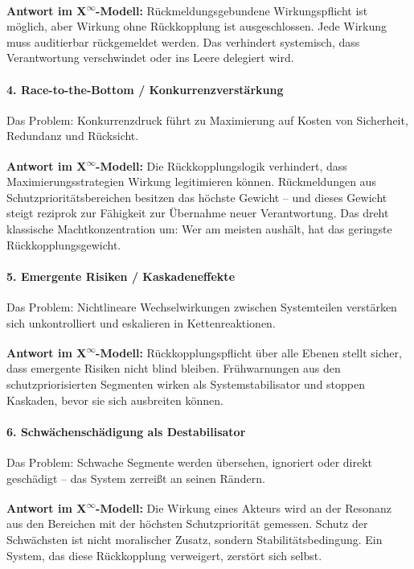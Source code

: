 \documentclass[12pt,a4paper]{article}
\begin{document}
\textbf{Antwort im X\textsuperscript{\(\infty\)}-Modell:}  
Rückmeldungsgebundene Wirkungspflicht ist möglich, aber Wirkung ohne Rückkopplung ist ausgeschlossen.  
Jede Wirkung muss auditierbar rückgemeldet werden.  
Das verhindert systemisch, dass Verantwortung verschwindet oder ins Leere delegiert wird.

\paragraph{4. Race-to-the-Bottom / Konkurrenzverstärkung}

Das Problem:  
Konkurrenzdruck führt zu Maximierung auf Kosten von Sicherheit, Redundanz und Rücksicht.

\textbf{Antwort im X\textsuperscript{\(\infty\)}-Modell:}  
Die Rückkopplungslogik verhindert, dass Maximierungsstrategien Wirkung legitimieren können.  
Rückmeldungen aus Schutzprioritätsbereichen besitzen das höchste Gewicht – und dieses Gewicht steigt reziprok zur Fähigkeit zur Übernahme neuer Verantwortung.  
Das dreht klassische Machtkonzentration um: Wer am meisten aushält, hat das geringste Rückkopplungsgewicht.

\paragraph{5. Emergente Risiken / Kaskadeneffekte}

Das Problem:  
Nichtlineare Wechselwirkungen zwischen Systemteilen verstärken sich unkontrolliert und eskalieren in Kettenreaktionen.

\textbf{Antwort im X\textsuperscript{\(\infty\)}-Modell:}  
Rückkopplungspflicht über alle Ebenen stellt sicher, dass emergente Risiken nicht blind bleiben.  
Frühwarnungen aus den schutzpriorisierten Segmenten wirken als Systemstabilisator und stoppen Kaskaden, bevor sie sich ausbreiten können.

\paragraph{6. Schwächenschädigung als Destabilisator}

Das Problem:  
Schwache Segmente werden übersehen, ignoriert oder direkt geschädigt – das System zerreißt an seinen Rändern.

\textbf{Antwort im X\textsuperscript{\(\infty\)}-Modell:}  
Die Wirkung eines Akteurs wird an der Resonanz aus den Bereichen mit der höchsten Schutzpriorität gemessen.  
Schutz der Schwächsten ist nicht moralischer Zusatz, sondern Stabilitätsbedingung.  
Ein System, das diese Rückkopplung verweigert, zerstört sich selbst.
\end{document}
